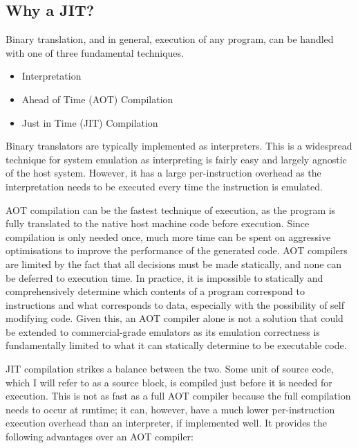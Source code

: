 \subsection{Why a JIT?}

Binary translation, and in general, execution of any program, can be handled with one of three fundamental techniques.

\begin{itemize}
    \item Interpretation
    \item Ahead of Time (AOT) Compilation
    \item Just in Time (JIT) Compilation
\end{itemize}

Binary translators are typically implemented as interpreters. This is a widespread technique for system emulation as interpreting is fairly easy and largely agnostic of the host system. However, it has a large per-instruction overhead as the interpretation needs to be executed every time the instruction is emulated.

AOT compilation can be the fastest technique of execution, as the program is fully translated to the native host machine code before execution. Since compilation is only needed once, much more time can be spent on aggressive optimisations to improve the performance of the generated code. AOT compilers are limited by the fact that all decisions must be made statically, and none can be deferred to execution time. In practice, it is impossible to statically and comprehensively determine which contents of a program correspond to instructions and what corresponds to data, especially with the possibility of self modifying code. Given this, an AOT compiler alone is not a solution that could be extended to commercial-grade emulators as its emulation correctness is fundamentally limited to what it can statically determine to be executable code.

JIT compilation strikes a balance between the two. Some unit of source code, which I will refer to as a source block, is compiled just before it is needed for execution. This is not as fast as a full AOT compiler because the full compilation needs to occur at runtime; it can, however, have a much lower per-instruction execution overhead than an interpreter, if implemented well. It provides the following advantages over an AOT compiler:

